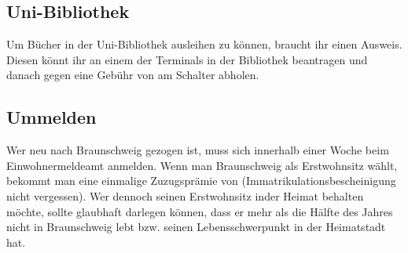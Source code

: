 \subsection{Uni-Bibliothek}

Um B\"ucher in der Uni-Bibliothek ausleihen zu k\"onnen, braucht ihr
einen Ausweis. Diesen k\"onnt ihr an einem der Terminals in der
Bibliothek beantragen und danach gegen eine Geb\"uhr von \unit[5]{\EUR}{}
am Schalter abholen.

\subsection{Ummelden}

Wer neu nach Braunschweig gezogen ist, muss sich innerhalb einer
Woche beim Einwohnermeldeamt anmelden. Wenn man Braunschweig als
Erstwohnsitz w\"ahlt, bekommt man eine einmalige Zuzugspr\"amie von
\unit[200]{\EUR}{} (Immatrikulationsbescheinigung nicht vergessen). Wer
dennoch seinen Erstwohnsitz inder Heimat behalten m\"ochte, sollte
glaubhaft darlegen k\"onnen, dass er mehr als die H\"alfte des Jahres
nicht in Braunschweig lebt bzw. seinen Lebensschwerpunkt in der
Heimatstadt hat.

